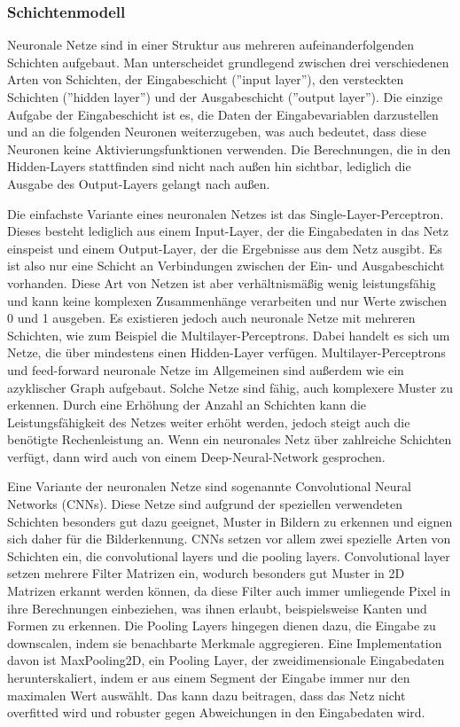 \subsubsection{Schichtenmodell}\label{subsec:neuronen:schichtenmodell}
Neuronale Netze sind in einer Struktur aus mehreren aufeinanderfolgenden Schichten aufgebaut.
Man unterscheidet grundlegend zwischen drei verschiedenen Arten von Schichten, der Eingabeschicht (''input layer''), den versteckten Schichten (''hidden layer'') und der Ausgabeschicht (''output layer'').
Die einzige Aufgabe der Eingabeschicht ist es, die Daten der Eingabevariablen darzustellen und an die folgenden Neuronen weiterzugeben, was auch bedeutet, dass diese Neuronen keine Aktivierungsfunktionen verwenden.
Die Berechnungen, die in den Hidden-Layers stattfinden sind nicht nach außen hin sichtbar, lediglich die Ausgabe des Output-Layers gelangt nach außen. \cite{CA18}

\bigbreak\noindent
Die einfachste Variante eines neuronalen Netzes ist das Single-Layer-Perceptron. Dieses besteht lediglich aus einem Input-Layer, der die Eingabedaten in das Netz einspeist und einem Output-Layer, der die Ergebnisse aus dem Netz ausgibt.
Es ist also nur eine Schicht an Verbindungen zwischen der Ein- und Ausgabeschicht vorhanden.
Diese Art von Netzen ist aber verhältnismäßig wenig leistungsfähig und kann keine komplexen Zusammenhänge verarbeiten und nur Werte zwischen 0 und 1 ausgeben.
Es existieren jedoch auch neuronale Netze mit mehreren Schichten, wie zum Beispiel die Multilayer-Perceptrons. Dabei handelt es sich um Netze, die über mindestens einen Hidden-Layer verfügen.
Multilayer-Perceptrons und feed-forward neuronale Netze im Allgemeinen sind außerdem wie ein azyklischer Graph aufgebaut.
Solche Netze sind fähig, auch komplexere Muster zu erkennen.
Durch eine Erhöhung der Anzahl an Schichten kann die Leistungsfähigkeit des Netzes weiter erhöht werden, jedoch steigt auch die benötigte Rechenleistung an.
Wenn ein neuronales Netz über zahlreiche Schichten verfügt, dann wird auch von einem Deep-Neural-Network gesprochen. \cite{CA18}

\bigbreak\noindent
Eine Variante der neuronalen Netze sind sogenannte Convolutional Neural Networks (CNNs). Diese Netze sind aufgrund der speziellen verwendeten Schichten besonders gut dazu geeignet, Muster in Bildern zu erkennen und eignen sich daher für die Bilderkennung.
CNNs setzen vor allem zwei spezielle Arten von Schichten ein, die convolutional layers und die pooling layers.
Convolutional layer setzen mehrere Filter Matrizen ein, wodurch besonders gut Muster in 2D Matrizen erkannt werden können, da diese Filter auch immer umliegende Pixel in ihre Berechnungen einbeziehen, was ihnen erlaubt, beispielsweise Kanten und Formen zu erkennen.
Die Pooling Layers hingegen dienen dazu, die Eingabe zu downscalen, indem sie benachbarte Merkmale aggregieren. Eine Implementation davon ist MaxPooling2D, ein Pooling Layer, der zweidimensionale Eingabedaten herunterskaliert, indem er aus einem Segment der Eingabe immer nur den maximalen Wert auswählt. Das kann dazu beitragen, dass das Netz nicht overfitted wird und robuster gegen Abweichungen in den Eingabedaten wird. \cite{CA18} \cite{KSH17}